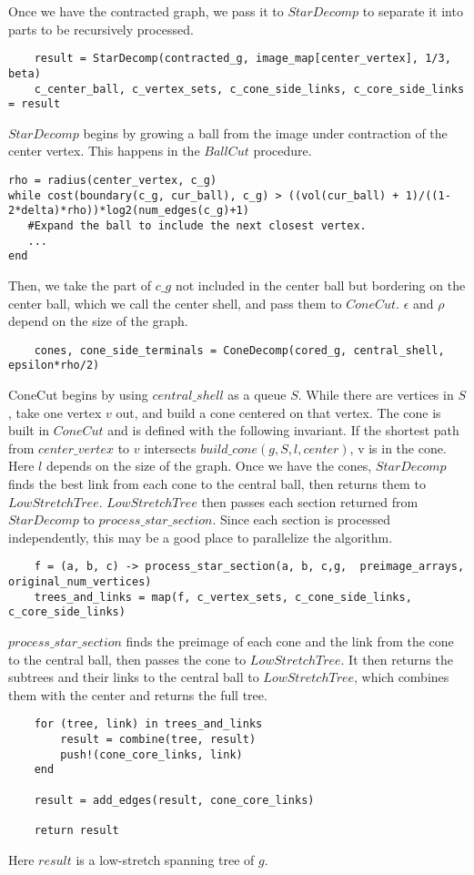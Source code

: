 \documentclass{article}
\begin{document}
Once we have the contracted graph, we pass it to $StarDecomp$ to separate it into parts to be recursively processed.
\begin{verbatim}
	result = StarDecomp(contracted_g, image_map[center_vertex], 1/3, beta)
	c_center_ball, c_vertex_sets, c_cone_side_links, c_core_side_links = result
\end{verbatim}
$StarDecomp$ begins by growing a ball from the image under contraction of the center vertex.  This happens in the $BallCut$ procedure. 
\begin{verbatim}
rho = radius(center_vertex, c_g)
while cost(boundary(c_g, cur_ball), c_g) > ((vol(cur_ball) + 1)/((1-2*delta)*rho))*log2(num_edges(c_g)+1)
   #Expand the ball to include the next closest vertex.
   ...
end
\end{verbatim}
Then, we take the part of $c\_g$ not included in the center ball but bordering on the center ball, which we call the center shell, and pass them to $ConeCut$.  $\epsilon$ and $\rho$ depend on the size of the graph.
\begin{verbatim}
	cones, cone_side_terminals = ConeDecomp(cored_g, central_shell, epsilon*rho/2)
\end{verbatim}
ConeCut begins by using $central\_shell$ as a queue $S$.  While there are vertices in $S$, take one vertex $v$ out, and build a cone centered on that vertex.  The cone is built in $ConeCut$ and is defined with the following invariant.  If the shortest path from $center\_vertex$ to $v$ intersects $build\_cone(g, S, l, center)$, v is in the cone.  Here $l$ depends on the size of the graph.
Once we have the cones, $StarDecomp$ finds the best link from each cone to the central ball, then returns them to $LowStretchTree$.  $LowStretchTree$ then passes each section returned from $StarDecomp$ to $process\_star\_section$.  Since each section is processed independently, this may be a good place to parallelize the algorithm. 
\begin{verbatim}
	f = (a, b, c) -> process_star_section(a, b, c,g,  preimage_arrays, original_num_vertices)
	trees_and_links = map(f, c_vertex_sets, c_cone_side_links, c_core_side_links)
\end{verbatim}
$process\_star\_section$ finds the preimage of each cone and the link from the cone to the central ball, then passes the cone to $LowStretchTree$.   It then returns the subtrees and their links to the central ball to $LowStretchTree$, which combines them with the center and returns the full tree.
\begin{verbatim}
	for (tree, link) in trees_and_links
		result = combine(tree, result)
		push!(cone_core_links, link)
	end

	result = add_edges(result, cone_core_links)

	return result
\end{verbatim}
Here $result$ is a low-stretch spanning tree of $g$.
\end{document}
